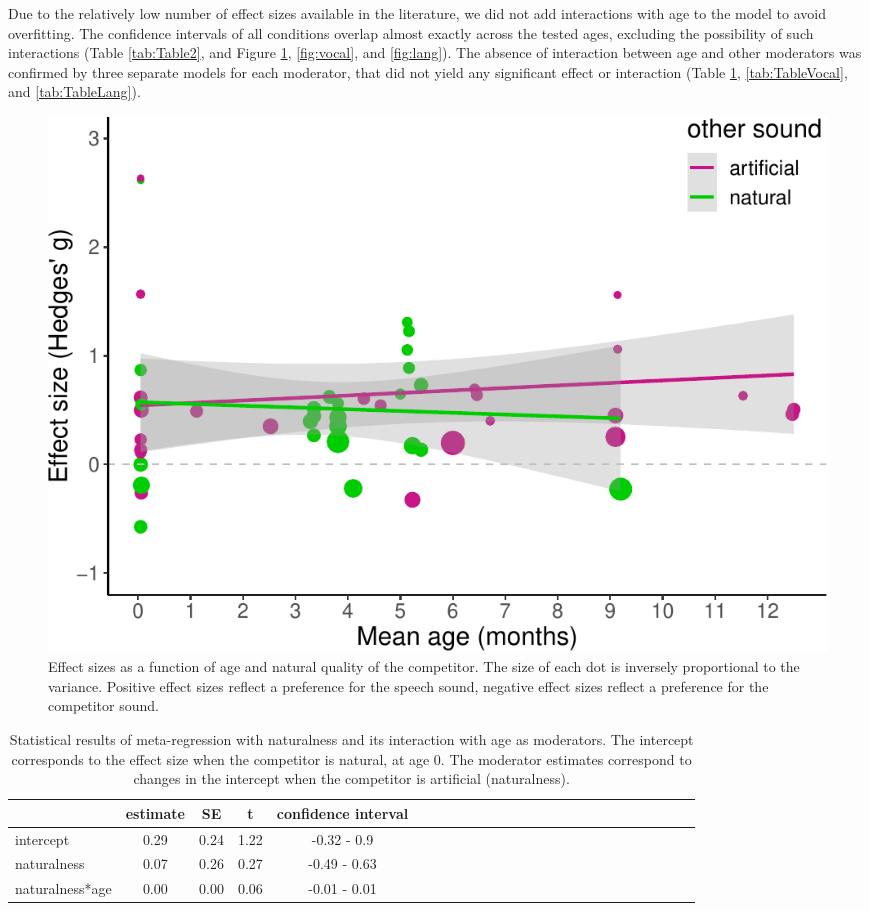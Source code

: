 \documentclass[man]{apa6}
\begin{document}
Due to the relatively low number of effect sizes available in the
literature, we did not add interactions with age to the model to avoid
overfitting. The confidence intervals of all conditions overlap almost
exactly across the tested ages, excluding the possibility of such
interactions (Table \ref{tab:Table2}, and Figure \ref{fig:natural},
\ref{fig:vocal}, and \ref{fig:lang}). The absence of interaction between
age and other moderators was confirmed by three separate models for each
moderator, that did not yield any significant effect or interaction
(Table \ref{tab:TableNatural}, \ref{tab:TableVocal}, and
\ref{tab:TableLang}).

\begin{figure}
\centering
\includegraphics{MA_speech_pref_files/figure-latex/natural-1.pdf}
\caption{\label{fig:natural}Effect sizes as a function of age and natural
quality of the competitor. The size of each dot is inversely
proportional to the variance. Positive effect sizes reflect a preference
for the speech sound, negative effect sizes reflect a preference for the
competitor sound.}
\end{figure}

\begin{table}[tbp]
\begin{center}
\begin{threeparttable}
\caption{\label{tab:TableNatural}Statistical results of meta-regression with naturalness and its interaction with age as moderators. The intercept corresponds to the effect size when the competitor is natural, at age 0. The moderator estimates correspond to changes in the intercept when the competitor is artificial (naturalness).}
\begin{tabular}{lcccclcccclcccclcccclcccc}
\toprule
 & estimate & SE & t & confidence interval\\
\midrule
intercept & 0.29 & 0.24 & 1.22 & -0.32 - 0.9\\
naturalness & 0.07 & 0.26 & 0.27 & -0.49 - 0.63\\
naturalness*age & 0.00 & 0.00 & 0.06 & -0.01 - 0.01\\
\bottomrule
\end{tabular}
\end{threeparttable}
\end{center}
\end{table}
\end{document}
